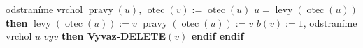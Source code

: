 \documentclass[a4paper,12pt]{article}
\DeclareMathOperator*{\otec}{otec}
\DeclareMathOperator*{\levy}{levy}
\DeclareMathOperator*{\pravy}{pravy}
\begin{document}
\phantom{------}odstraníme vrchol $\pravy(u)$, $\otec(v):=\otec(u)$\newline
\phantom{------}{\bf if} $u=\levy(\otec(u))$ {\bf then}\newline 
\phantom{---------}$\levy(\otec(u)):=v$\newline 
\phantom{------}{\bf else}\newline 
\phantom{---------}$\pravy(\otec(u)):=v$\newline 
\phantom{------}{\bf endif}\newline 
\phantom{------}$b(v):=1$, odstraníme vrchol $u$\newline 
\phantom{---}{\bf endif} \newline 
\phantom{---}{\bf if} $vyv$ {\bf then Vyvaz-DELETE$(v)$ endif\newline 
endif}
\end{document}
